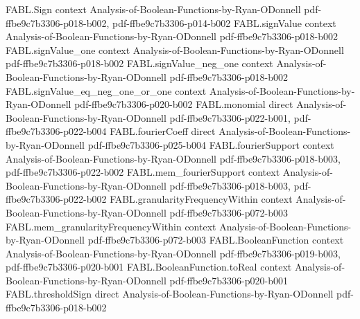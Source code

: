 \begin{theorem}
\label{FABL.sum_fourierCoeff_singleton_eq_majority_iff}
\leanok
{}
\proofstep
  {FABL.Sign}
  {context}
  {Analysis-of-Boolean-Functions-by-Ryan-ODonnell}
  {pdf-ffbe9c7b3306-p018-b002,
    pdf-ffbe9c7b3306-p014-b002}
\proofstep
  {FABL.signValue}
  {context}
  {Analysis-of-Boolean-Functions-by-Ryan-ODonnell}
  {pdf-ffbe9c7b3306-p018-b002}
\proofstep
  {FABL.signValue_one}
  {context}
  {Analysis-of-Boolean-Functions-by-Ryan-ODonnell}
  {pdf-ffbe9c7b3306-p018-b002}
\proofstep
  {FABL.signValue_neg_one}
  {context}
  {Analysis-of-Boolean-Functions-by-Ryan-ODonnell}
  {pdf-ffbe9c7b3306-p018-b002}
\proofstep
  {FABL.signValue_eq_neg_one_or_one}
  {context}
  {Analysis-of-Boolean-Functions-by-Ryan-ODonnell}
  {pdf-ffbe9c7b3306-p020-b002}
\proofstep
  {FABL.monomial}
  {direct}
  {Analysis-of-Boolean-Functions-by-Ryan-ODonnell}
  {pdf-ffbe9c7b3306-p022-b001,
    pdf-ffbe9c7b3306-p022-b004}
\proofstep
  {FABL.fourierCoeff}
  {direct}
  {Analysis-of-Boolean-Functions-by-Ryan-ODonnell}
  {pdf-ffbe9c7b3306-p025-b004}
\proofstep
  {FABL.fourierSupport}
  {context}
  {Analysis-of-Boolean-Functions-by-Ryan-ODonnell}
  {pdf-ffbe9c7b3306-p018-b003,
    pdf-ffbe9c7b3306-p022-b002}
\proofstep
  {FABL.mem_fourierSupport}
  {context}
  {Analysis-of-Boolean-Functions-by-Ryan-ODonnell}
  {pdf-ffbe9c7b3306-p018-b003,
    pdf-ffbe9c7b3306-p022-b002}
\proofstep
  {FABL.granularityFrequencyWithin}
  {context}
  {Analysis-of-Boolean-Functions-by-Ryan-ODonnell}
  {pdf-ffbe9c7b3306-p072-b003}
\proofstep
  {FABL.mem_granularityFrequencyWithin}
  {context}
  {Analysis-of-Boolean-Functions-by-Ryan-ODonnell}
  {pdf-ffbe9c7b3306-p072-b003}
\proofstep
  {FABL.BooleanFunction}
  {context}
  {Analysis-of-Boolean-Functions-by-Ryan-ODonnell}
  {pdf-ffbe9c7b3306-p019-b003,
    pdf-ffbe9c7b3306-p020-b001}
\proofstep
  {FABL.BooleanFunction.toReal}
  {context}
  {Analysis-of-Boolean-Functions-by-Ryan-ODonnell}
  {pdf-ffbe9c7b3306-p020-b001}
\proofstep
  {FABL.thresholdSign}
  {direct}
  {Analysis-of-Boolean-Functions-by-Ryan-ODonnell}
  {pdf-ffbe9c7b3306-p018-b002}

\end{theorem}
